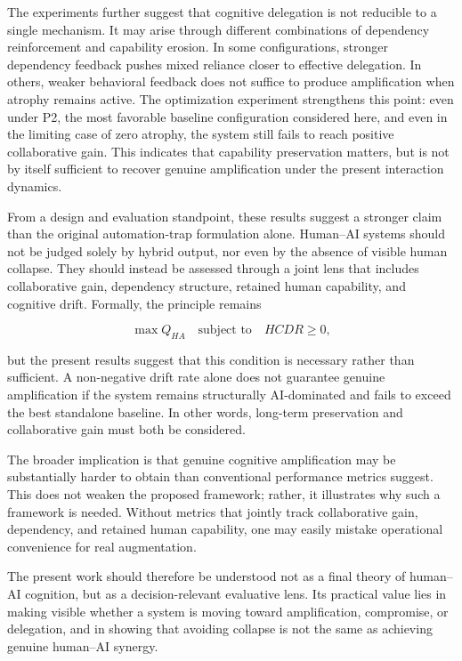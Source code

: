 \documentclass[11pt,a4paper]{article}
\begin{document}
The experiments further suggest that cognitive delegation is not reducible to a single mechanism. It may arise through different combinations of dependency reinforcement and capability erosion. In some configurations, stronger dependency feedback pushes mixed reliance closer to effective delegation. In others, weaker behavioral feedback does not suffice to produce amplification when atrophy remains active. The optimization experiment strengthens this point: even under P2, the most favorable baseline configuration considered here, and even in the limiting case of zero atrophy, the system still fails to reach positive collaborative gain. This indicates that capability preservation matters, but is not by itself sufficient to recover genuine amplification under the present interaction dynamics.

From a design and evaluation standpoint, these results suggest a stronger claim than the original automation-trap formulation alone. Human--AI systems should not be judged solely by hybrid output, nor even by the absence of visible human collapse. They should instead be assessed through a joint lens that includes collaborative gain, dependency structure, retained human capability, and cognitive drift. Formally, the principle remains

\[
\max Q_{HA}
\quad \text{subject to} \quad
HCDR \ge 0,
\]

but the present results suggest that this condition is necessary rather than sufficient. A non-negative drift rate alone does not guarantee genuine amplification if the system remains structurally AI-dominated and fails to exceed the best standalone baseline. In other words, long-term preservation and collaborative gain must both be considered.

The broader implication is that genuine cognitive amplification may be substantially harder to obtain than conventional performance metrics suggest. This does not weaken the proposed framework; rather, it illustrates why such a framework is needed. Without metrics that jointly track collaborative gain, dependency, and retained human capability, one may easily mistake operational convenience for real augmentation.

The present work should therefore be understood not as a final theory of human--AI cognition, but as a decision-relevant evaluative lens. Its practical value lies in making visible whether a system is moving toward amplification, compromise, or delegation, and in showing that avoiding collapse is not the same as achieving genuine human--AI synergy.
\end{document}
